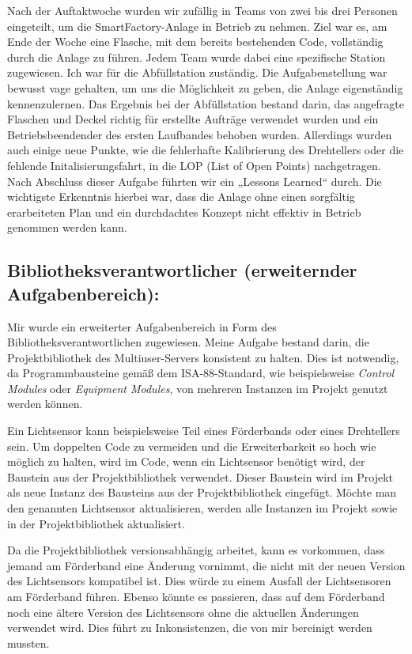 Nach der Auftaktwoche wurden wir zufällig in Teams von zwei bis drei Personen eingeteilt, um die SmartFactory-Anlage 
in Betrieb zu nehmen. Ziel war es, am Ende der Woche eine Flasche, mit dem bereits bestehenden Code, vollständig durch 
die Anlage zu führen. Jedem Team wurde dabei eine spezifische Station zugewiesen. Ich war für die Abfüllstation zuständig. 
Die Aufgabenstellung war bewusst vage gehalten, um uns die Möglichkeit zu geben, die Anlage eigenständig kennenzulernen. 
Das Ergebnis bei der Abfüllstation bestand darin, das angefragte Flaschen und Deckel richtig für erstellte Aufträge 
verwendet wurden und ein Betriebsbeendender des ersten Laufbandes behoben wurden. Allerdings wurden auch einige neue Punkte, 
wie die fehlerhafte Kalibrierung des Drehtellers oder die fehlende Initalisierungsfahrt, in die LOP (List of Open Points) 
nachgetragen. Nach Abschluss dieser Aufgabe führten wir ein „Lessons Learned“ durch. Die wichtigste Erkenntnis hierbei war, 
dass die Anlage ohne einen sorgfältig erarbeiteten Plan und ein durchdachtes Konzept nicht effektiv in Betrieb 
genommen werden kann.

\subsection{Bibliotheksverantwortlicher (erweiternder Aufgabenbereich):} 

Mir wurde ein erweiterter Aufgabenbereich in Form des Bibliotheksverantwortlichen zugewiesen. Meine Aufgabe bestand darin, 
die Projektbibliothek des Multiuser-Servers konsistent zu halten. Dies ist notwendig, da Programmbausteine gemäß dem 
ISA-88-Standard, wie beispielsweise \textit{Control Modules} oder \textit{Equipment Modules}, von mehreren Instanzen im 
Projekt genutzt werden können.

Ein Lichtsensor kann beispielsweise Teil eines Förderbands oder eines Drehtellers sein. Um doppelten Code zu vermeiden und 
die Erweiterbarkeit so hoch wie möglich zu halten, wird im Code, wenn ein Lichtsensor benötigt wird, der Baustein aus der 
Projektbibliothek verwendet. Dieser Baustein wird im Projekt als neue Instanz des Bausteins aus der Projektbibliothek 
eingefügt. Möchte man den genannten Lichtsensor aktualisieren, werden alle Instanzen im Projekt sowie in der 
Projektbibliothek aktualisiert.

Da die Projektbibliothek versionsabhängig arbeitet, kann es vorkommen, dass jemand am Förderband eine Änderung vornimmt, die 
nicht mit der neuen Version des Lichtsensors kompatibel ist. Dies würde zu einem Ausfall der Lichtsensoren am Förderband 
führen. Ebenso könnte es passieren, dass auf dem Förderband noch eine ältere Version des Lichtsensors ohne die aktuellen 
Änderungen verwendet wird. Dies führt zu Inkonsistenzen, die von mir bereinigt werden mussten.

